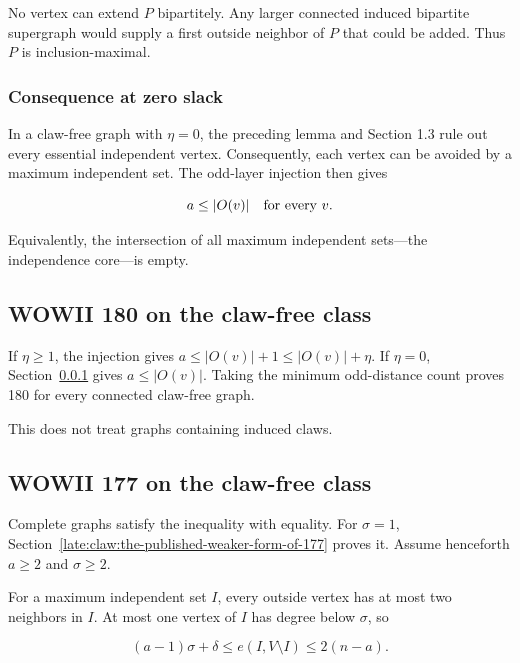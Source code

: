 \documentclass[11pt,a4paper]{article}
\theoremstyle{definition}\newtheorem{definition}[theorem]{Definition}
\theoremstyle{remark}\newtheorem{remark}[theorem]{Remark}
\begin{document}
No vertex can extend \(P\) bipartitely. Any larger connected induced
bipartite supergraph would supply a first outside neighbor of \(P\) that
could be added. Thus \(P\) is inclusion-maximal.

\subsubsection{Consequence at zero
slack}\label{late:claw:consequence-at-zero-slack}

In a claw-free graph with \(\eta=0\), the preceding lemma and Section
1.3 rule out every essential independent vertex. Consequently, each
vertex can be avoided by a maximum independent set. The odd-layer
injection then gives

\[a\le |O(v)|\quad\hbox{for every }v.\]

Equivalently, the intersection of all maximum independent sets---the
independence core---is empty.

\subsection{WOWII 180 on the claw-free
class}\label{late:claw:wowii-180-on-the-claw-free-class}

If \(\eta\ge1\), the injection gives \(a\le |O(v)|+1\le |O(v)|+\eta\).
If \(\eta=0\), Section~\ref{late:claw:consequence-at-zero-slack} gives \(a\le |O(v)|\). Taking the minimum
odd-distance count proves 180 for every connected claw-free graph.

This does not treat graphs containing induced claws.

\subsection{WOWII 177 on the claw-free
class}\label{late:claw:wowii-177-on-the-claw-free-class}

Complete graphs satisfy the inequality with equality. For \(\sigma=1\),
Section~\ref{late:claw:the-published-weaker-form-of-177} proves it. Assume henceforth \(a\ge2\) and \(\sigma\ge2\).

For a maximum independent set \(I\), every outside vertex has at most
two neighbors in \(I\). At most one vertex of \(I\) has degree below
\(\sigma\), so

\begin{equation}\label{late:claw:incidence}
 (a-1)\sigma+\delta\le e(I,V\setminus I)\le2(n-a).
\end{equation}
\end{document}
